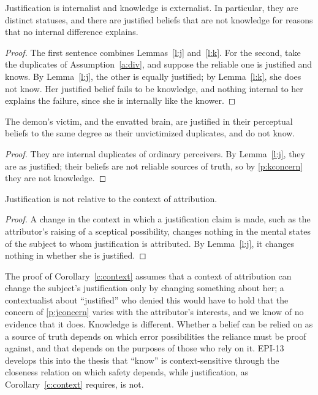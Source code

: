 \documentclass{situationist-preprint}
\begin{document}
\begin{theorem}\label{t:main}
Justification is internalist and knowledge is externalist. In particular, they are distinct statuses, and there are justified beliefs that are not knowledge for reasons that no internal difference explains.
\end{theorem}

\begin{proof}
The first sentence combines Lemmas~\ref{l:j} and~\ref{l:k}. For the second, take the duplicates of Assumption~\ref{a:div}, and suppose the reliable one is justified and knows. By Lemma~\ref{l:j}, the other is equally justified; by Lemma~\ref{l:k}, she does not know. Her justified belief fails to be knowledge, and nothing internal to her explains the failure, since she is internally like the knower.
\end{proof}

\begin{corollary}\label{c:demon}
The demon's victim, and the envatted brain, are justified in their perceptual beliefs to the same degree as their unvictimized duplicates, and do not know.
\end{corollary}

\begin{proof}
They are internal duplicates of ordinary perceivers. By Lemma~\ref{l:j}, they are as justified; their beliefs are not reliable sources of truth, so by \ref{p:kconcern} they are not knowledge.
\end{proof}

\begin{corollary}[Context]\label{c:context}
Justification is not relative to the context of attribution.
\end{corollary}

\begin{proof}
A change in the context in which a justification claim is made, such as the attributor's raising of a sceptical possibility, changes nothing in the mental states of the subject to whom justification is attributed. By Lemma~\ref{l:j}, it changes nothing in whether she is justified.
\end{proof}

The proof of Corollary~\ref{c:context} assumes that a context of attribution can change the subject's justification only by changing something about her; a contextualist about \enquote{justified} who denied this would have to hold that the concern of \ref{p:jconcern} varies with the attributor's interests, and we know of no evidence that it does. Knowledge is different. Whether a belief can be relied on as a source of truth depends on which error possibilities the reliance must be proof against, and that depends on the purposes of those who rely on it. EPI-13 develops this into the thesis that \enquote{know} is context-sensitive through the closeness relation on which safety depends, while justification, as Corollary~\ref{c:context} requires, is not.
\end{document}
